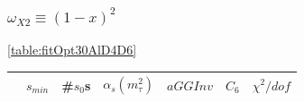 \documentclass[../../index.tex]{subfiles}
\begin{document}
\subsubsection{\(\omega_{X2} \equiv (1-x)^2\)}
\cref{table:fitOpt30AlD4D6}
\begin{table}
  \centering
  \begin{tabular}{lllllll}
    \toprule
    & \(s_{min}\) & \#\(s_0\)s & \(\alpha_s(m_\tau^2)\) & \(aGGInv\) & \(C_{6}\) & \(\chi^2/dof\)  \\
    \midrule



\end{tabular}
\end{table}
\end{document}
